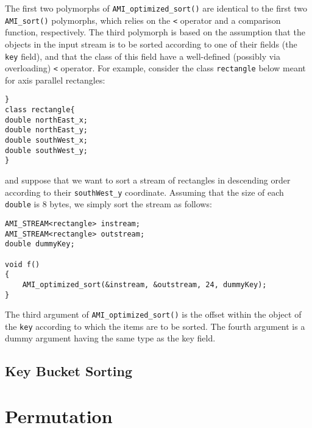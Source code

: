 The first two polymorphs of \verb|AMI_optimized_sort()| are identical to
the first two \verb|AMI_sort()| polymorphs, which relies on the \verb|<|
operator and a comparison function, respectively. The third polymorph is based on the assumption that the objects in
the input stream is to be sorted according to one of their fields (the
\verb|key| field), and that the class of this field have a well-defined
(possibly via overloading) \verb|<| operator. For example, consider the
class \verb|rectangle| below meant for axis parallel rectangles:

\begin{verbatim}}
class rectangle{
double northEast_x;
double northEast_y;
double southWest_x;
double southWest_y;
}
\end{verbatim}

and suppose that we want to sort a stream of rectangles in descending order
according to their \verb|southWest_y| coordinate. Assuming that the size
of each \verb|double| is 8 bytes, we simply sort the stream as follows:
 
\begin{verbatim}
AMI_STREAM<rectangle> instream;
AMI_STREAM<rectangle> outstream;
double dummyKey;

void f()
{
    AMI_optimized_sort(&instream, &outstream, 24, dummyKey);
}
\end{verbatim}

The third argument of \verb|AMI_optimized_sort()| is the offset within the
object of the \verb|key| according to which the items are to be sorted. The
fourth argument is a dummy argument having the same type as the key
field.




\subsection{Key Bucket Sorting}
\label{sec:kb-sorting}


\tobewritten


\section{Permutation}

